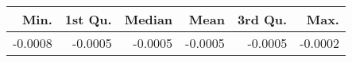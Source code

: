 \begin{table}[ht]
\centering
\begin{tabular}{rrrrrr}
  \hline
Min. & 1st Qu. & Median & Mean & 3rd Qu. & Max. \\ 
  \hline
-0.0008 & -0.0005 & -0.0005 & -0.0005 & -0.0005 & -0.0002 \\ 
   \hline
\end{tabular}
\end{table}
